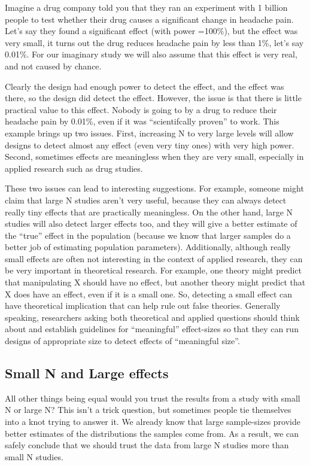 \documentclass[
]{book}
\begin{document}
Imagine a drug company told you that they ran an experiment with 1 billion people to test whether their drug causes a significant change in headache pain. Let's say they found a significant effect (with power =100\%), but the effect was very small, it turns out the drug reduces headache pain by less than 1\%, let's say 0.01\%. For our imaginary study we will also assume that this effect is very real, and not caused by chance.

Clearly the design had enough power to detect the effect, and the effect was there, so the design did detect the effect. However, the issue is that there is little practical value to this effect. Nobody is going to by a drug to reduce their headache pain by 0.01\%, even if it was ``scientifcally proven'' to work.
This example brings up two issues. First, increasing N to very large levels will allow designs to detect almost any effect (even very tiny ones) with very high power. Second, sometimes effects are meaningless when they are very small, especially in applied research such as drug studies.

These two issues can lead to interesting suggestions. For example, someone might claim that large N studies aren't very useful, because they can always detect really tiny effects that are practically meaningless. On the other hand, large N studies will also detect larger effects too, and they will give a better estimate of the ``true'' effect in the population (because we know that larger samples do a better job of estimating population parameters). Additionally, although really small effects are often not interesting in the context of applied research, they can be very important in theoretical research. For example, one theory might predict that manipulating X should have no effect, but another theory might predict that X does have an effect, even if it is a small one. So, detecting a small effect can have theoretical implication that can help rule out false theories. Generally speaking, researchers asking both theoretical and applied questions should think about and establish guidelines for ``meaningful'' effect-sizes so that they can run designs of appropriate size to detect effects of ``meaningful size''.

\hypertarget{small-n-and-large-effects}{%
\subsection{Small N and Large effects}\label{small-n-and-large-effects}}

All other things being equal would you trust the results from a study with small N or large N? This isn't a trick question, but sometimes people tie themselves into a knot trying to answer it. We already know that large sample-sizes provide better estimates of the distributions the samples come from. As a result, we can safely conclude that we should trust the data from large N studies more than small N studies.
\end{document}
